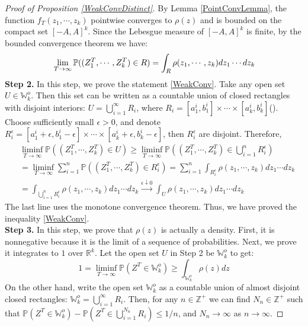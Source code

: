\begin{proof}[Proof of Proposition \ref{WeakConvDistinct}]
By Lemma \ref{PointConvLemma}, the function $f_{T}(z_{1},\cdots,z_{k})$ pointwise converges to $\rho(z)$ and is bounded on the compact set $[-A,A]^{k}$. Since the Lebesgue measure of $[-A,A]^{k}$ is finite, by the bounded convergence theorem we have:
\begin{align}{\label{ConvOnRect}}
	\lim_{T\rightarrow\infty}\mathbb{P}((Z_{1}^{T},\cdots,Z_{k}^{T})\in R)=\int_{R}\rho(z_{1},\cdots,z_{k})dz_{1}\cdots dz_{k}
\end{align}
\textbf{Step 2. }In this step, we prove the statement \ref{WeakConv}. Take any open set $U\in \mathbb{W}_{k}^{o}$. Then this set can be written as a countable union of closed rectangles with disjoint interiors: $U=\bigcup_{i=1}^{\infty}R_{i}$, where $R_{i}=[a_{1}^{i},b_{1}^{i}]\times\cdots\times[a_{k}^{i},b_{k}^{i}]$(\cite[Theorem 1.4]{Stein}). Choose sufficiently small $\epsilon>0$, and denote $R_{i}^{\epsilon}=[a_{1}^{i}+\epsilon,b_{1}^{i}-\epsilon]\times\cdots\times[a_{k}^{i}+\epsilon,b_{k}^{i}-\epsilon]$, then $R_{i}^{\epsilon}$ are disjoint. Therefore,
\begin{align*}
	&\liminf_{T\rightarrow\infty}\mathbb{P}((Z_{1}^{T},\cdots,Z_{k}^{T})\in U)\geqslant\liminf_{T\rightarrow\infty}\mathbb{P}((Z_{1}^{T},\cdots,Z_{k}^{T})\in \bigcup_{i=1}^{n}R_{i}^{\epsilon})\\
	&=\liminf_{T\rightarrow\infty}\sum_{i=1}^{n}\mathbb{P}((Z_{1}^{T},\cdots,Z_{k}^{T})\in R_{i}^{\epsilon})=\sum_{i=1}^{n}\int_{R_{i}^{\epsilon}}\rho(z_1,\cdots,z_{k})dz_{1}\cdots dz_{k}\\
	&=\int_{\bigcup_{i=1}^{n}R_{i}^{\epsilon}}\rho(z_1,\cdots,z_{k})dz_{1}\cdots dz_{k} \xrightarrow{\epsilon\downarrow 0} \int_{U}\rho(z_1,\cdots,z_{k})dz_{1}\cdots dz_{k}
\end{align*}
The last line uses the monotone convergence theorem. Thus, we have proved the inequality \ref{WeakConv}.\\
\textbf{Step 3. }In this step, we prove that $\rho(z)$ is actually a density. First, it is nonnegative because it is the limit of a sequence of probabilities. Next, we prove it integrates to $1$ over $\mathbb{R}^{k}$. Let the open set $U$ in Step 2 be $\mathbb{W}_{k}^{o}$ to get: $$1=\liminf_{T\rightarrow\infty}\mathbb{P}(Z^{T}\in \mathbb{W}_{k}^{o})\geqslant \int_{\mathbb{W}_{k}^{o}}\rho(z)dz$$
On the other hand, write the open set $\mathbb{W}_{k}^{o}$ as a countable union of almost disjoint closed rectangles: $\mathbb{W}_{k}^{o}=\bigcup_{i=1}^{\infty}R_{i}$. Then, for any $n\in\mathbb{Z}^{+}$ we can find $N_{n}\in \mathbb{Z}^{+}$ such that $\mathbb{P}(Z^{T}\in\mathbb{W}_{k}^{o})-\mathbb{P}(Z^{T}\in\bigcup_{i=1}^{N_{n}}R_{i})\leq 1/n$, and $N_{n}\rightarrow\infty$ as $n\rightarrow\infty$. 

\end{proof}
